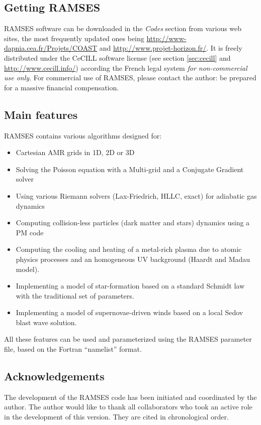 \subsection{Getting RAMSES}

RAMSES software can be downloaded in the \emph{Codes} section from various web
sites, the most frequently updated ones being
\url{http://www-dapnia.cea.fr/Projets/COAST} and
\url{http://www.projet-horizon.fr/}.  It is freely distributed under the CeCILL
software license (see section \ref{sec:cecill} and
\url{http://www.cecill.info/}) according the French legal system \emph{for
non-commercial use only}. For commercial use of RAMSES, please contact the
author: be prepared for a massive financial compensation.

\subsection{Main features}
RAMSES contains various algorithms designed for:

\begin{itemize}
   \item Cartesian AMR grids in 1D, 2D or 3D
   \item Solving the Poisson equation with a Multi-grid and a Conjugate
Gradient solver
   \item Using various Riemann solvers (Lax-Friedrich, HLLC, exact) for
adiabatic gas dynamics
   \item Computing collision-less particles (dark matter and stars)
dynamics using a PM code
   \item Computing the cooling and heating of a metal-rich plasma due to
atomic physics processes and an homogeneous UV background (Haardt and
Madau model).
   \item Implementing a model of star-formation based on a standard
Schmidt law with the traditional set of parameters.
   \item Implementing a model of supernovae-driven winds based on a
local Sedov blast wave solution.
\end{itemize}

All these features can be used and parameterized using the RAMSES
parameter file, based on the Fortran ``namelist'' format.

\subsection{Acknowledgements}

The development of the RAMSES code has been initiated and coordinated by
the author. The author would like to thank all collaborators who took an
active role in the development of this version. They are cited in
chronological order.

